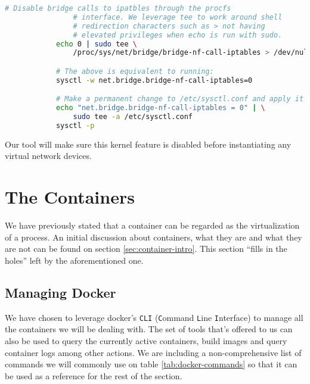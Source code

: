         \begin{lstlisting}[language = bash, caption = Disabling bridge calls to \texttt{iptables}., label = lst:disable-brd-iptables]
            # Disable bridge calls to ipatbles through the procfs
                # interface. We leverage tee to work around shell
                # redirection characters such as > not having
                # elevated privileges when echo is run with sudo.
            echo 0 | sudo tee \
                /proc/sys/net/bridge/bridge-nf-call-iptables > /dev/null

            # The above is equivalent to running:
            sysctl -w net.bridge.bridge-nf-call-iptables=0

            # Make a permanent change to /etc/sysctl.conf and apply it
            echo "net.bridge.bridge-nf-call-iptables = 0" | \
                sudo tee -a /etc/sysctl.conf
            sysctl -p
        \end{lstlisting}

        Our tool will make sure this kernel feature is disabled before instantiating any virtual network devices.\\

    \section{The Containers} \label{sec:container-techy}
        We have previously stated that a container can be regarded as the virtualization of a process. An initial discussion about containers, what they are and what they are not can be found on section \ref{sec:container-intro}. This section ``fills in the holes'' left by the aforementioned one.\\

        \subsection{Managing Docker}
            We have chosen to leverage docker's \texttt{CLI} (\texttt{C}ommand \texttt{L}ine \texttt{I}nterface) to manage all the containers we will be dealing with. The set of tools that's offered to us can also be used to query the currently active containers, build images and query container logs among other actions. We are including a non-comprehensive list of commands we will commonly use on table \ref{tab:docker-commands} so that it can be used as a reference for the rest of the section.\\

